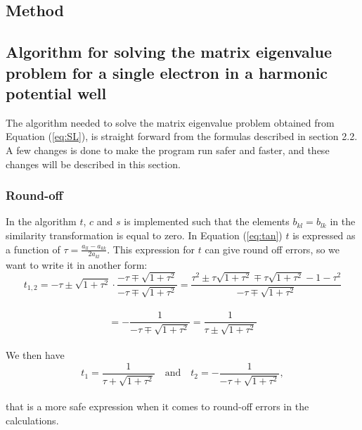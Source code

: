 \documentclass[12pt]{article}
\begin{document}
\begin{flushleft}
\newpage

\section{Method}
\subsection{Algorithm for solving the matrix eigenvalue problem for a single electron in a harmonic potential well}
The algorithm needed to solve the matrix eigenvalue problem obtained from Equation (\ref{eq:SL}), is straight forward from the formulas described in section 2.2. A few changes is done to make the program run safer and faster, and these changes will be described in this section.\\
\subsubsection{Round-off}
In the algorithm $t$, $c$ and $s$ is implemented such that the elements $b_{kl}=b_{lk}$ in the similarity transformation is equal to zero. In Equation (\ref{eq:tan}) $t$ is expressed as a function of $\tau = \frac{a_{ll}-a_{kk}}{2a_{kl}}$. This expression for $t$ can give round off errors, so we want to write it in another form:\\     
\vspace{5mm}
$$t_{1,2} = -\tau\pm\sqrt{1+\tau^2}\cdot\frac{-\tau\mp\sqrt{1+\tau^2}}{-\tau\mp\sqrt{1+\tau^2}} = \frac{\tau^2\pm\tau\sqrt{1+\tau^2}\mp\tau\sqrt{1+\tau^2}-1-\tau^2}{-\tau\mp\sqrt{1+\tau^2}}$$\\
\vspace{3mm}
$$ = -\frac{1}{-\tau\mp\sqrt{1+\tau^2}} = \frac{1}{\tau\pm\sqrt{1+\tau^2}}$$\\
\vspace{5mm}
We then have 
\vspace{5mm}
$$t_1 = \frac{1}{\tau+\sqrt{1+\tau^2}} \quad \text{and}\quad t_2 = -\frac{1}{-\tau+\sqrt{1+\tau^2}},$$\\
\vspace{5mm}
that is a more safe expression when it comes to round-off errors in the calculations.

\end{flushleft}
\end{document}
